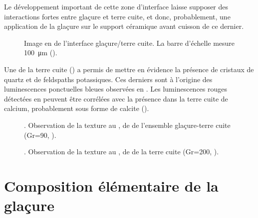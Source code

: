 Le développement important de cette zone d'interface laisse supposer 
des interactions fortes entre glaçure et terre cuite, et donc, 
probablement, une application de la glaçure sur le support céramique 
avant cuisson de ce dernier.

\begin{figure}[htb]
  \caption[\ -- Observation de la texture au \MEB, 
           en mode \ERD. Interface glaçure/terre cuite]
          {\legendeB
           Image en \ERD de l'interface glaçure/terre cuite. 
           La barre d'échelle mesure \SI{100}{\um} ().}
  \label{MEB:6529_img_int}
\end{figure}

Une \carto de la terre cuite () a permis de 
mettre en évidence la présence de cristaux de quartz et de feldspaths 
potassiques. Ces derniers sont à l'origine des luminescences 
ponctuelles bleues observées en \CL. Les luminescences rouges 
détectées en \CL peuvent être corrélées avec la présence dans la terre 
cuite de calcium, probablement sous forme de calcite (\calcite).

\begin{figure}[htb]
  \caption[\ -- Observation de la texture au \MEB, \carto 
           de \RX de l'ensemble glaçure-terre cuite]
          {\legendeB.
           Observation de la texture au \MEB, \carto de \RX de 
           l'ensemble glaçure-terre cuite (Gr=90, ).}
  \label{MEB:6529_carto_tcgla}
\end{figure}

\begin{figure}[htb]
  \caption[\ -- Observation de la texture au \MEB, \carto 
           de \RX de la terre cuite]
          {\legendeB.
           Observation de la texture au \MEB, \carto de \RX de la 
           terre cuite (Gr=200, ).}
  \label{MEB:6529_carto_tc}
\end{figure}


\section{Composition élémentaire de la glaçure}

